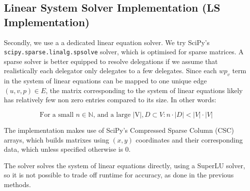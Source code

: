 
\subsection{Linear System Solver Implementation (LS Implementation)}

Secondly, we use a a dedicated linear equation solver. We try SciPy's \texttt{scipy.sparse.linalg.spsolve} solver, which is optimised for sparse matrices. A sparse solver is better equipped to resolve delegations if we assume that realistically each delegator only delegates to a few delegates. Since each $wp_v$ term in the system of linear equations can be mapped to one unique edge $(u, v, p) \in E$, the matrix corresponding to the system of linear equations likely has relatively few non zero entries compared to its size. In other words:

\[
\text{For a small } n \in \mathbb{N} \text{, and a large |V|}, D \subset V: n \cdot |D| < |V| \cdot |V|
\]

 
 The implementation makes use of SciPy's Compressed Sparse Column (CSC) arrays, which builds matrixes using $(x,y)$ coordinates and their corresponding data, which unless specified otherwise is 0. 
 

The solver solves the system of linear equations directly, using a SuperLU solver, so it is not possible to trade off runtime for accuracy, as done in the previous methods.





